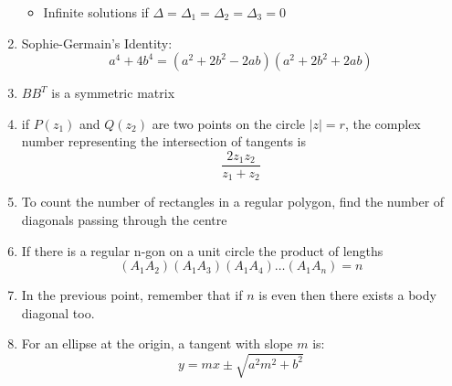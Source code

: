 \documentclass{article}
\numberwithin{equation}{section}
\numberwithin{figure}{section}
\begin{document}
\begin{enumerate}
\begin{itemize}
				\item Infinite solutions if $\Delta=\Delta_1=\Delta_2=\Delta_3=0$
			\end{itemize}
		\item Sophie-Germain's Identity:
			\begin{equation}
				a^{4} + 4b^{4} = (a^{2}+2b^{2}-2ab)(a^{2}+2b^{2}+2ab)
			\end{equation}
		\item $BB^{T}$ is a symmetric matrix
		\item if $P(z_1)$ and $Q(z_2)$ are two points on the circle $|z|=r$, the complex number representing the intersection of tangents is $$\frac{2 z_1 z_2}{z_1+z_2}$$
		\item To count the number of rectangles in a regular polygon, find the number of diagonals passing through the centre
		\item If there is a regular n-gon on a unit circle the product of lengths $$(A_1 A_2)(A_1 A_3)(A_1 A_4)\dots (A_1 A_n)=n$$
		\item In the previous point, remember that if $n$ is even then there exists a body diagonal too. 
		\item For an ellipse at the origin, a tangent with slope $m$ is:
			\begin{equation}
				y=mx \pm \sqrt{a^2 m^2 + b^2}
			\end{equation}


\end{enumerate}
\end{document}
